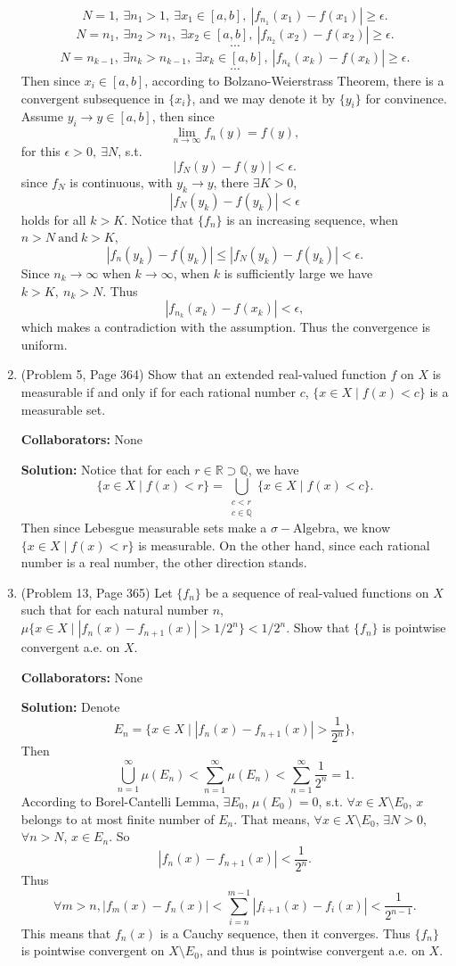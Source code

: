 \documentclass{article}%
\begin{document}
\begin{enumerate}
$$
N = 1, ~\exists n_1 > 1, ~\exists x_1\in[a, b], ~|f_{n_1}(x_1)-f(x_1)| \geqslant \epsilon.
$$
$$
N = n_1, ~\exists n_2 > n_1, ~\exists x_2\in[a, b], ~|f_{n_2}(x_2)-f(x_2)| \geqslant \epsilon.
$$
$$
\cdots
$$
$$
N = n_{k-1}, ~\exists n_k > n_{k-1}, ~\exists x_k\in[a, b], ~|f_{n_k}(x_k)-f(x_k)| \geqslant \epsilon.
$$
$$
\cdots
$$
Then since $x_i\in [a, b]$, according to Bolzano-Weierstrass Theorem, there is a convergent subsequence in $\{x_i\}$, and we may denote it by $\{y_i\}$ for convinence. Assume $y_i\to y\in [a, b]$, then since
$$
\lim_{n\to\infty}f_n(y) = f(y),
$$
for this $\epsilon > 0, ~\exists N$, s.t.
$$
|f_N(y)-f(y)|<\epsilon.
$$
since $f_N$ is continuous, with $y_k\to y$, there $\exists K > 0$, 
$$
|f_N(y_k)-f(y_k)| < \epsilon
$$
holds for all $k > K$. Notice that $\{f_n\}$ is an increasing sequence, when $n > N ~\text{and}~ k > K$, 
$$
|f_n(y_k)-f(y_k)| \leqslant |f_N(y_k)-f(y_k)|<\epsilon.
$$
Since $n_k\to\infty$ when $k\to\infty$, when $k$ is sufficiently large we have $k > K, ~n_k > N$. Thus 
$$
|f_{n_k}(x_k)-f(x_k)| < \epsilon,
$$ 
which makes a contradiction with the assumption. Thus the convergence is uniform.
\bigskip



\item  (Problem 5, Page 364) Show that an extended real-valued function $f$ on $X$ is measurable if and only if for each rational number $c$, $\{x\in X \mid f(x)< c\}$ is a  measurable set.


\bigskip
\textbf{Collaborators:} None
\smallskip
 
\textbf{Solution:}
Notice that for each $r\in \mathbb{R}\supset\mathbb{Q}$, we have
$$
\{x\in X\mid f(x) < r\} = \bigcup_{\substack{c < r \\ c \in \mathbb{Q}}}\{x\in X\mid f(x) < c\}.
$$
Then since Lebesgue measurable sets make a $\sigma-$Algebra, we know $\{x\in X\mid f(x) < r\}$ is measurable. On the other hand, since each rational number is a real number, the other direction stands.
\bigskip

\item (Problem 13, Page 365) Let $\{f_n\}$ be a sequence of real-valued functions on $X$ such that for each natural number $n$, $\mu \{x\in X \mid |f_n (x) - f_{n+1}(x)|> 1/2^n\}<1/2^n$. Show that $\{f_n\}$ is pointwise convergent a.e. on $X$.

\bigskip
\textbf{Collaborators:} None
\smallskip
 
\textbf{Solution:}
Denote
$$
E_n = \{x\in X\mid |f_n(x)-f_{n+1}(x)|>\frac{1}{2^n}\},
$$
Then 
$$
\bigcup_{n=1}^{\infty}\mu(E_n) < \sum_{n=1}^{\infty}\mu(E_n) < \sum_{n=1}^{\infty}\frac{1}{2^n} = 1.
$$
According to Borel-Cantelli Lemma, $\exists E_0$, $\mu(E_0) = 0$, s.t. $\forall x\in X\setminus E_0$, $x$ belongs to at most finite number of $E_n$. That means, $\forall x\in X\setminus E_0$, $\exists N > 0$, $\forall n > N$, $x\in E_n$. So 
$$
|f_n(x)-f_{n+1}(x)| < \frac{1}{2^n}.
$$
Thus 
$$
\forall m > n, |f_m(x)-f_{n}(x)| < \sum_{i=n}^{m-1}|f_{i+1}(x)-f_i(x)| < \frac{1}{2^{n-1}}.
$$
This means that $f_n(x)$ is a Cauchy sequence, then it converges. Thus $\{f_n\}$ is pointwise convergent on $X\setminus E_0$, and thus is pointwise convergent a.e. on $X$.
\bigskip


\end{enumerate}
\end{document}
